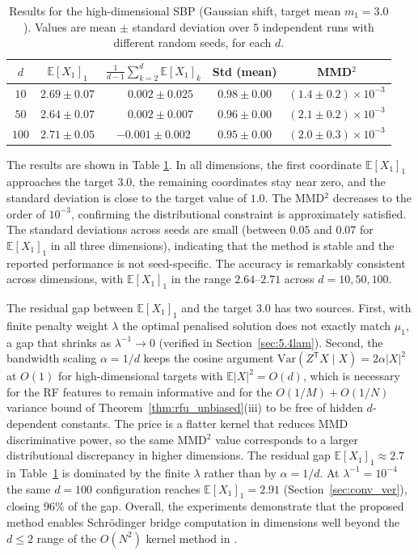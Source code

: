 \documentclass[11pt,leqno]{article}
\theoremstyle{plain}
\theoremstyle{remark}
\theoremstyle{definition}
\numberwithin{equation}{section}
\numberwithin{figure}{section}
\numberwithin{table}{section}
\numberwithin{algorithm}{section}
\newcommand{\EE}{\mathbb{E}}
\begin{document}
\begin{table}[htbp]
\centering
\caption{Results for the high-dimensional SBP (Gaussian shift, target mean $m_1=3.0$).
Values are mean $\pm$ standard deviation over $5$ independent runs with different random seeds, for each $d$.}
\label{tab:sbp_result}
\begin{tabular}{ccccc}
\toprule
$d$ & $\EE[X_1]_1$ & $\frac{1}{d-1}\sum_{k=2}^{d}\EE[X_1]_k$ & Std (mean) & MMD${}^2$ \\
\midrule
$10$  & $2.69\pm 0.07$ & $\phantom{-}0.002\pm 0.025$ & $0.98\pm 0.00$ & $(1.4\pm 0.2)\times 10^{-3}$ \\
$50$  & $2.64\pm 0.07$ & $\phantom{-}0.002\pm 0.007$ & $0.96\pm 0.00$ & $(2.1\pm 0.2)\times 10^{-3}$ \\
$100$ & $2.71\pm 0.05$ & $-0.001\pm 0.002$ & $0.95\pm 0.00$ & $(2.0\pm 0.3)\times 10^{-3}$ \\
\bottomrule
\end{tabular}
\end{table}

The results are shown in Table \ref{tab:sbp_result}.
In all dimensions, the first coordinate $\EE[X_1]_1$ approaches the target $3.0$,
the remaining coordinates stay near zero,
and the standard deviation is close to the target value of $1.0$.
The MMD${}^2$ decreases to the order of $10^{-3}$, confirming the distributional constraint is approximately satisfied.
The standard deviations across seeds are small (between $0.05$ and $0.07$ for $\EE[X_1]_1$ in all three dimensions),
indicating that the method is stable and the reported performance is not seed-specific.
The accuracy is remarkably consistent across dimensions, with $\EE[X_1]_1$ in the range $2.64$--$2.71$ across $d=10, 50, 100$.

The residual gap between $\EE[X_1]_1$ and the target $3.0$ has two sources.
First, with finite penalty weight $\lambda$ the optimal penalised solution does not exactly match $\mu_1$,
a gap that shrinks as $\lambda^{-1}\to 0$ (verified in Section~\ref{sec:5.4lam}).
Second, the bandwidth scaling $\alpha=1/d$ keeps the cosine argument
$\mathrm{Var}(Z^{\mathsf{T}}X\mid X)=2\alpha|X|^2$ at $O(1)$ for high-dimensional targets with $\EE|X|^2=O(d)$,
which is necessary for the RF features to remain informative and for the
$O(1/M)+O(1/N)$ variance bound of Theorem~\ref{thm:rfu_unbiased}(iii) to be free of hidden $d$-dependent constants. 
The price is a flatter kernel that reduces MMD discriminative power,
so the same MMD${}^2$ value corresponds to a larger distributional discrepancy in higher dimensions.
The residual gap $\EE[X_1]_1\approx 2.7$ in Table~\ref{tab:sbp_result}
is dominated by the finite $\lambda$ rather than by $\alpha=1/d$. 
At $\lambda^{-1}=10^{-4}$ the same $d=100$ configuration reaches $\EE[X_1]_1=2.91$
(Section~\ref{sec:conv_ver}), closing $96\%$ of the gap.
Overall, the experiments demonstrate that the proposed method enables Schr{\"o}dinger bridge computation
in dimensions well beyond the $d\le 2$ range of the $O(N^2)$ kernel method in \cite{nak:2024sb}.
\end{document}
